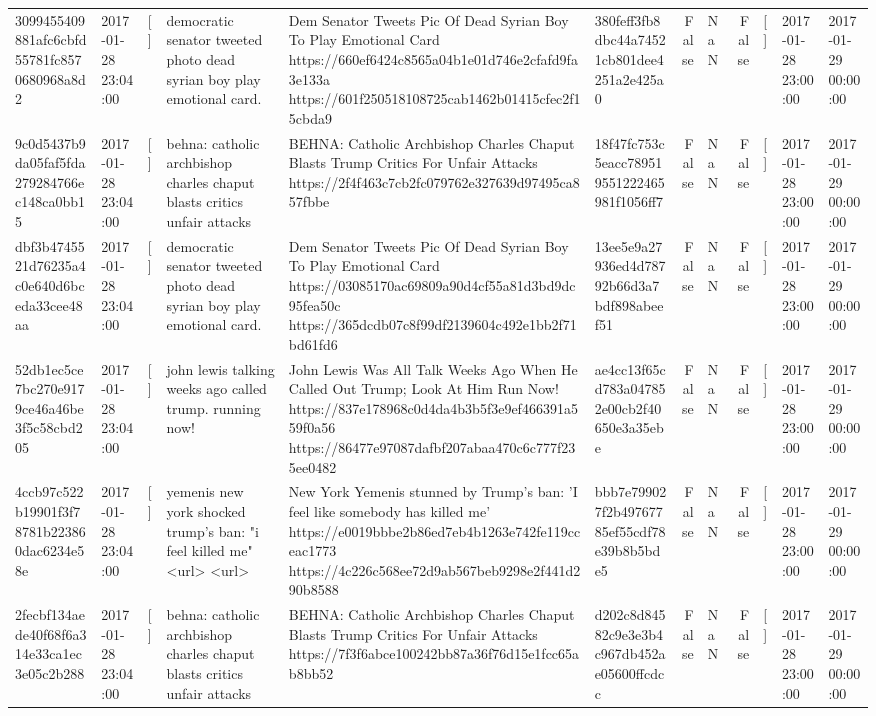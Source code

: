 \begin{tabular}{llllllrlrlll}
3099455409881afc6cbfd55781fc8570680968a8d2 & 2017-01-28 23:04:00 & [] & democratic senator tweeted photo dead syrian boy play emotional card. & Dem Senator Tweets Pic Of Dead Syrian Boy To Play Emotional Card https://660ef6424c8565a04b1e01d746e2cfafd9fa3e133a https://601f250518108725cab1462b01415cfec2f15cbda9 & 380feff3fb8dbc44a74521cb801dee4251a2e425a0 & False & NaN & False & [] & 2017-01-28 23:00:00 & 2017-01-29 00:00:00 \\
9c0d5437b9da05faf5fda279284766ec148ca0bb15 & 2017-01-28 23:04:00 & [] & behna: catholic archbishop charles chaput blasts critics unfair attacks & BEHNA: Catholic Archbishop Charles Chaput Blasts Trump Critics For Unfair Attacks https://2f4f463c7cb2fc079762e327639d97495ca857fbbe & 18f47fc753c5eacc789519551222465981f1056ff7 & False & NaN & False & [] & 2017-01-28 23:00:00 & 2017-01-29 00:00:00 \\
dbf3b4745521d76235a4c0e640d6bceda33cee48aa & 2017-01-28 23:04:00 & [] & democratic senator tweeted photo dead syrian boy play emotional card. & Dem Senator Tweets Pic Of Dead Syrian Boy To Play Emotional Card https://03085170ac69809a90d4cf55a81d3bd9dc95fea50c https://365dcdb07c8f99df2139604c492e1bb2f71bd61fd6 & 13ee5e9a27936ed4d78792b66d3a7bdf898abeef51 & False & NaN & False & [] & 2017-01-28 23:00:00 & 2017-01-29 00:00:00 \\
52db1ec5ce7bc270e9179ce46a46be3f5c58cbd205 & 2017-01-28 23:04:00 & [] & john lewis talking weeks ago called trump. running now! & John Lewis Was All Talk Weeks Ago When He Called Out Trump; Look At Him Run Now! https://837e178968c0d4da4b3b5f3e9ef466391a559f0a56 https://86477e97087dafbf207abaa470c6c777f235ee0482 & ae4cc13f65cd783a047852e00cb2f40650e3a35ebe & False & NaN & False & [] & 2017-01-28 23:00:00 & 2017-01-29 00:00:00 \\
4ccb97c522b19901f3f78781b223860dac6234e58e & 2017-01-28 23:04:00 & [] & yemenis new york shocked trump's ban: "i feel killed me" <url> <url> & New York Yemenis stunned by Trump's ban: 'I feel like somebody has killed me' https://e0019bbbe2b86ed7eb4b1263e742fe119cceac1773 https://4c226c568ee72d9ab567beb9298e2f441d290b8588 & bbb7e799027f2b49767785ef55cdf78e39b8b5bde5 & False & NaN & False & [] & 2017-01-28 23:00:00 & 2017-01-29 00:00:00 \\
2fecbf134aede40f68f6a314e33ca1ec3e05c2b288 & 2017-01-28 23:04:00 & [] & behna: catholic archbishop charles chaput blasts critics unfair attacks & BEHNA: Catholic Archbishop Charles Chaput Blasts Trump Critics For Unfair Attacks https://7f3f6abce100242bb87a36f76d15e1fcc65ab8bb52 & d202c8d84582c9e3e3b4c967db452ae05600ffcdcc & False & NaN & False & [] & 2017-01-28 23:00:00 & 2017-01-29 00:00:00 \\

\end{tabular}

